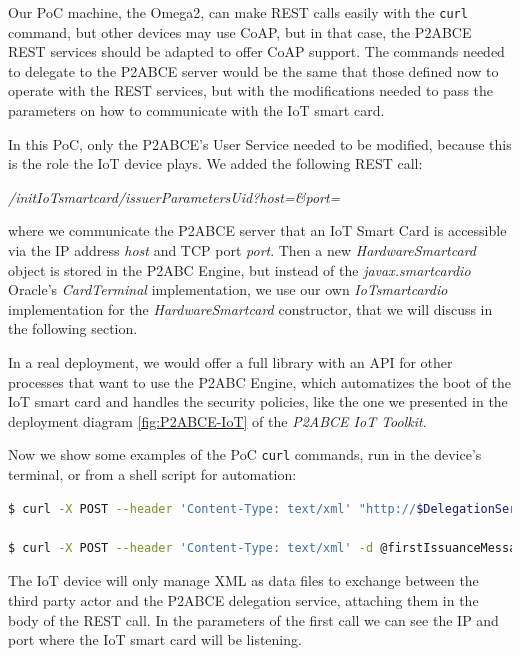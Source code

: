 Our PoC machine, the Omega2, can make REST calls easily with the \texttt{curl} command, but other devices may use \ac{CoAP}, but in that case, the P2ABCE REST services should be adapted to offer CoAP support. The commands needed to delegate to the P2ABCE server would be the same that those defined now to operate with the REST services, but with the modifications needed to pass the parameters on how to communicate with the IoT smart card.

In this PoC, only the P2ABCE's User Service needed to be modified, because this is the role the IoT device plays. We added the following REST call:
\begin{center}
	\textit{/initIoTsmartcard/{issuerParametersUid}?host=\&port=}
\end{center}
where we communicate the P2ABCE server that an IoT Smart Card is accessible via the IP address \textit{host} and TCP port \textit{port}. Then a new \textit{HardwareSmartcard} object is stored in the P2ABC Engine, but instead of the \textit{javax.smartcardio} Oracle's \textit{CardTerminal} implementation, we use our own \textit{IoTsmartcardio} implementation for the \textit{HardwareSmartcard} constructor, that we will discuss in the following section.


\hfil

In a real deployment, we would offer a full library with an API for other processes that want to use the P2ABC Engine, which automatizes the boot of the IoT smart card and handles the security policies, like the one we presented in the deployment diagram \ref{fig:P2ABCE-IoT} of the \textit{P2ABCE IoT Toolkit}.

Now we show some examples of the PoC \texttt{curl} commands, run in the device's terminal, or from a shell script for automation:

\begin{lstlisting}[language=bash]
$ curl -X POST --header 'Content-Type: text/xml' "http://$DelegationServerIP:9200/user/initIoTsmartcard/http%3A%2F%2Fticketcompany%2FMyFavoriteSoccerTeam%2Fissuance%3Aidemix?host=192.168.3.1&port=8888"

$ curl -X POST --header 'Content-Type: text/xml' -d @firstIssuanceMessage.xml "http://$DelegationServerIP:9200/user/issuanceProtocolStep/" > issuanceReturn.xml
\end{lstlisting}

The IoT device will only manage XML as data files to exchange between the third party actor and the P2ABCE delegation service, attaching them in the body of the REST call. In the parameters of the first call we can see the IP and port where the IoT smart card will be listening.



